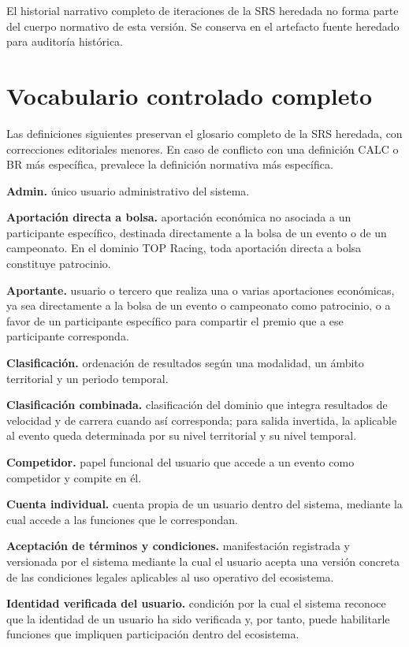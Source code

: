 \documentclass[10pt,letterpaper]{article}
\begin{document}
El historial narrativo completo de iteraciones de la SRS heredada no forma parte del cuerpo normativo de esta versión. Se conserva en el artefacto fuente heredado para auditoría histórica.

\appendix
\section{Vocabulario controlado completo}
Las definiciones siguientes preservan el glosario completo de la SRS heredada, con correcciones editoriales menores. En caso de conflicto con una definición CALC o BR más específica, prevalece la definición normativa más específica.

\noindent\textbf{Admin.} único usuario administrativo del sistema.\par
\noindent\textbf{Aportación directa a bolsa.} aportación económica no asociada a un participante específico, destinada directamente a la bolsa de un evento o de un campeonato. En el dominio TOP Racing, toda aportación directa a bolsa constituye patrocinio.\par
\noindent\textbf{Aportante.} usuario o tercero que realiza una o varias aportaciones económicas, ya sea directamente a la bolsa de un evento o campeonato como patrocinio, o a favor de un participante específico para compartir el premio que a ese participante corresponda.\par
\noindent\textbf{Clasificación.} ordenación de resultados según una modalidad, un ámbito territorial y un periodo temporal.\par
\noindent\textbf{Clasificación combinada.} clasificación del dominio que integra resultados de velocidad y de carrera cuando así corresponda; para salida invertida, la aplicable al evento queda determinada por su nivel territorial y su nivel temporal.\par
\noindent\textbf{Competidor.} papel funcional del usuario que accede a un evento como competidor y compite en él.\par
\noindent\textbf{Cuenta individual.} cuenta propia de un usuario dentro del sistema, mediante la cual accede a las funciones que le correspondan.\par
\noindent\textbf{Aceptación de términos y condiciones.} manifestación registrada y versionada por el sistema mediante la cual el usuario acepta una versión concreta de las condiciones legales aplicables al uso operativo del ecosistema.\par
\noindent\textbf{Identidad verificada del usuario.} condición por la cual el sistema reconoce que la identidad de un usuario ha sido verificada y, por tanto, puede habilitarle funciones que impliquen participación dentro del ecosistema.\par
\end{document}
